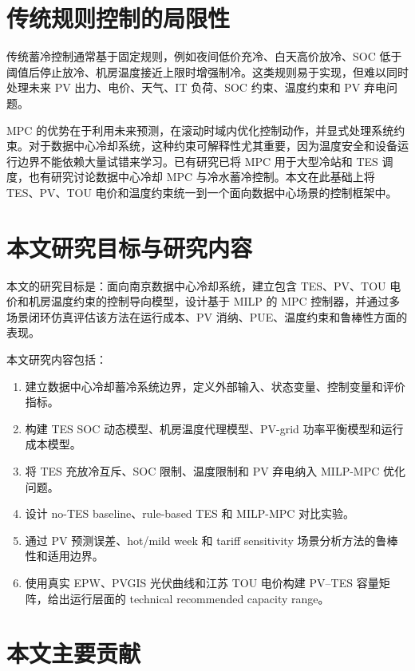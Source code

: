 \documentclass[UTF8,a4paper,12pt]{ctexrep}
\begin{document}
\section{传统规则控制的局限性}

传统蓄冷控制通常基于固定规则，例如夜间低价充冷、白天高价放冷、SOC 低于阈值后停止放冷、机房温度接近上限时增强制冷。这类规则易于实现，但难以同时处理未来 PV 出力、电价、天气、IT 负荷、SOC 约束、温度约束和 PV 弃电问题。

MPC 的优势在于利用未来预测，在滚动时域内优化控制动作，并显式处理系统约束。对于数据中心冷却系统，这种约束可解释性尤其重要，因为温度安全和设备运行边界不能依赖大量试错来学习。已有研究已将 MPC 用于大型冷站和 TES 调度\citep{ma2009tesMpc,ma2010buildingCoolingMpc,kim2022mpcTesPv}，也有研究讨论数据中心冷却 MPC 与冷水蓄冷控制\citep{lazic2018datacenterMpc,zhu2024hybridCoolingStorage,zhao2024multiChillerMpc}。本文在此基础上将 TES、PV、TOU 电价和温度约束统一到一个面向数据中心场景的控制框架中。

\section{本文研究目标与研究内容}

本文的研究目标是：面向南京数据中心冷却系统，建立包含 TES、PV、TOU 电价和机房温度约束的控制导向模型，设计基于 MILP 的 MPC 控制器，并通过多场景闭环仿真评估该方法在运行成本、PV 消纳、PUE、温度约束和鲁棒性方面的表现。

本文研究内容包括：

\begin{enumerate}[label=(\arabic*)]
  \item 建立数据中心冷却蓄冷系统边界，定义外部输入、状态变量、控制变量和评价指标。
  \item 构建 TES SOC 动态模型、机房温度代理模型、PV-grid 功率平衡模型和运行成本模型。
  \item 将 TES 充放冷互斥、SOC 限制、温度限制和 PV 弃电纳入 MILP-MPC 优化问题。
  \item 设计 no-TES baseline、rule-based TES 和 MILP-MPC 对比实验。
  \item 通过 PV 预测误差、hot/mild week 和 tariff sensitivity 场景分析方法的鲁棒性和适用边界。
  \item 使用真实 EPW、PVGIS 光伏曲线和江苏 TOU 电价构建 PV--TES 容量矩阵，给出运行层面的 technical recommended capacity range。
\end{enumerate}

\section{本文主要贡献}
\end{document}
